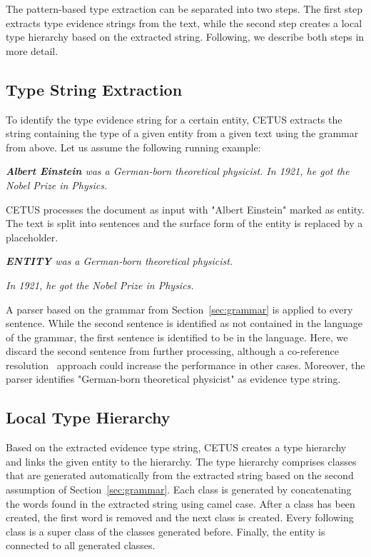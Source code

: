 The pattern-based type extraction can be separated into two steps.
The first step extracts type evidence strings from the text, while the second step creates a local type hierarchy based on the extracted string.
Following, we describe both steps in more detail.

\subsection{Type String Extraction}

To identify the type evidence string for a certain entity, CETUS extracts the string containing the type of a given entity from a given text using the grammar from above.
Let us assume the following running example: 

\begin{center}
\emph{\textbf{Albert Einstein} was a German-born theoretical physicist. In 1921, he got the Nobel Prize in Physics. }
\end{center}

CETUS processes the document as input with "Albert Einstein" marked as entity.
The text is split into sentences and the surface form of the entity is replaced by a placeholder. 

\begin{center}
\emph{\textbf{ENTITY} was a German-born theoretical physicist.}

\emph{In 1921, he got the Nobel Prize in Physics.}
\end{center}

A parser based on the grammar from Section~\ref{sec:grammar} is applied to every sentence.
While the second sentence is identified as not contained in the language of the grammar, the first sentence is identified to be in the language.
Here, we discard the second sentence from further processing, although a co-reference resolution~\cite{NgongaNgomo2014} approach could increase the performance in other cases.
Moreover, the parser identifies "German-born theoretical physicist" as evidence type string.

\subsection{Local Type Hierarchy}

Based on the extracted evidence type string, CETUS creates a type hierarchy and links the given entity to the hierarchy.
The type hierarchy comprises classes that are generated automatically from the extracted string based on the second assumption of Section~\ref{sec:grammar}.
Each class is generated by concatenating the words found in the extracted string using camel case.
After a class has been created, the first word is removed and the next class is created.
Every following class is a super class of the classes generated before.
Finally, the entity is connected to all generated classes.


